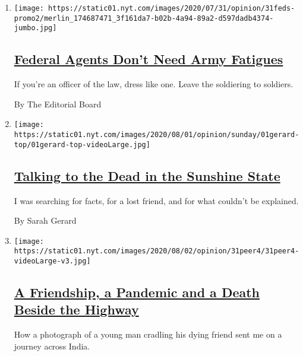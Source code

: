 \begin{enumerate}
\def\labelenumi{\arabic{enumi}.}
\item
  \texttt{[image: https://static01.nyt.com/images/2020/07/31/opinion/31feds-promo2/merlin\_174687471\_3f161da7-b02b-4a94-89a2-d597dadb4374-jumbo.jpg]}

  \hypertarget{federal-agents-dont-need-army-fatigues}{%
  \subsection{\texorpdfstring{\href{/2020/07/31/opinion/federal-agents-trump-uniforms.html}{Federal
  Agents Don't Need Army
  Fatigues}}{Federal Agents Don't Need Army Fatigues}}\label{federal-agents-dont-need-army-fatigues}}

  If you're an officer of the law, dress like one. Leave the soldiering
  to soldiers.

  By The Editorial Board
\item
  \texttt{[image: https://static01.nyt.com/images/2020/08/01/opinion/sunday/01gerard-top/01gerard-top-videoLarge.jpg]}

  \hypertarget{talking-to-the-dead-in-the-sunshine-state}{%
  \subsection{\texorpdfstring{\href{/2020/08/01/opinion/spiritualism-cassadaga-florida.html}{Talking
  to the Dead in the Sunshine
  State}}{Talking to the Dead in the Sunshine State}}\label{talking-to-the-dead-in-the-sunshine-state}}

  I was searching for facts, for a lost friend, and for what couldn't be
  explained.

  By Sarah Gerard
\item
  \texttt{[image: https://static01.nyt.com/images/2020/08/02/opinion/31peer4/31peer4-videoLarge-v3.jpg]}

  \hypertarget{a-friendship-a-pandemic-and-a-death-beside-the-highway}{%
  \subsection{\texorpdfstring{\href{/2020/07/31/opinion/sunday/India-migration-coronavirus.html}{A
  Friendship, a Pandemic and a Death Beside the
  Highway}}{A Friendship, a Pandemic and a Death Beside the Highway}}\label{a-friendship-a-pandemic-and-a-death-beside-the-highway}}

  How a photograph of a young man cradling his dying friend sent me on a
  journey across India.


\end{enumerate}
